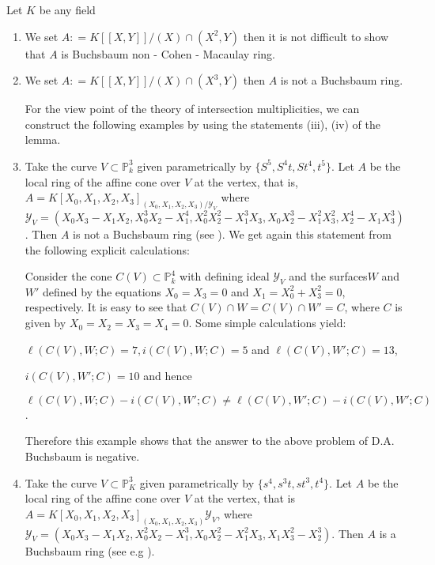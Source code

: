 \setcounter{example}{9}
\begin{example}\label{chap0:sec1:exp0.10}
 Let $K$ be any field
\begin{enumerate}[(1)]
\item We set $A:  = K [[X, Y]]/(X) \cap (X^2, Y)$ then it is not
  difficult to show that $A$ is Buchsbaum non - Cohen - Macaulay
  ring. 
\item We set $A:  = K [[X, Y]]/(X) \cap (X^3, Y)$ then $A$ is not a
  Buchsbaum ring. 

  For the view point of the theory of intersection multiplicities, we
  can construct the following examples by using the statements (iii),
  (iv) of the lemma. 
\item Take the curve $V \subset \mathbb{P}^3_k$ given parametrically
  by $\{ S^5, S^4t, St^4, t^5 \}$. Let $A$ be the local ring of the
  affine cone over $V$ at the vertex, that is, $A = K [X_0, X_1,X_2,
    X_3]_{(X_0, X_1,X_2, X_3)/ \mathscr{Y}_V}$ where $\mathscr{Y}_V =
  (X_0 X_3 -X_1X_2, X^3_0 X_2 - X^4_1, X^2_0 X^2_2 -X^3_1
  X_3,  X_0 X^3_2 - X_1^2X_3^2, X^4_2 - X_1 X^3_3)$. Then $A$ is not a Buchsbaum
  ring (see \cite{62}). We get again this statement from the following
  explicit calculations: 

  Consider the cone $C(V) \subset \mathbb{P}^4_k$ with defining ideal
  $\mathscr{Y}_V$ and the surfaces\pageoriginale $W$ and $W'$ defined by the
  equations $X_0 = X_3 = 0$ and $X_1 = X^2_0 + X^2_3= 0$,
  respectively. It is easy to see that $C(V) \cap W = C (V) \cap W' =
  C$, where $C$ is given by $X_0 = X_2 = X_3 = X_4 = 0$. Some simple
  calculations yield: 

  $\ell(C(V), W;C) = 7, i(C(V), W; C) = 5 $ and $\ell(C(V), W';C) = 13$,

  $i(C(V), W'; C) = 10 $ and hence

  $\ell(C(V), W;C) - i(C(V), W'; C) \neq \ell(C(V), W';C) - i(C(V), W'; C)$.

  Therefore this example shows that the answer to the above problem of
  D.A. Buchsbaum is negative.   
\item Take the curve $V \subset \mathbb{P}^3_K$ given parametrically by
  $\{ s^4, s^3t, st^3, t^4 \}$. Let $A$ be the local ring of the
  affine cone over $V$ at the vertex, that is $A = K [X_0, X_1, X_2,
    X_3]_{(X_0, X_1, X_2, X_3)} \mathscr{Y}_V$, where $\mathscr{Y}_V =
  (X_0 X_3 -X_1X_2, X^2_0X_2 - X^3_1, X_0 X^2_2 - X^2_1 X_3, X_1 X^2_3
  - X^3_2)$. Then $A$ is a Buchsbaum ring (see e.g \cite{83}).  
\end{enumerate} 
\end{example}

